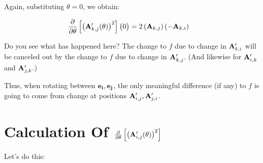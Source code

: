 \documentclass[11pt, oneside]{amsart}
\begin{document}
Again, substituting $\theta = 0$, we obtain:

\begin{equation*}
  \begin{split}
    \frac{\partial }{\partial \theta} \left[ \left( \mathbf{A}'_{k, j}(\theta) \right)^2 \right] \big(0\big)
      ={}&
        2
        \left( \mathbf{A}_{k, j} \right)
        \left( -\mathbf{A}_{k, i} \right)
  \end{split}
\end{equation*}

Do you see what has happened here? The change to $f$ due to change in
$\mathbf{A}'_{k, i}$ will be canceled out by the change to $f$ due to change
in $\mathbf{A}'_{k, j}$. (And likewise for $\mathbf{A}'_{i, k}$ and $\mathbf{A}'_{j,
k}$.)

Thus, when rotating between $\mathbf{e}_{\mathbf{i}}, \mathbf{e}_{\mathbf{j}}$, the only meaningful
difference (if any) to $f$ is going to come from change at positions
$\mathbf{A}'_{i, j}, \mathbf{A}'_{j, i}$.

\section{Calculation Of $\frac{\partial }{\partial \theta} \left[ \left( \mathbf{A}'_{i, j}(\theta) \right)^2 \right]$}

Let's do this:
\end{document}
